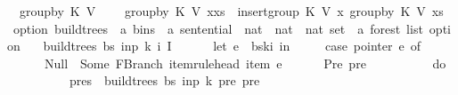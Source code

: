 \begin{isabellebody}
\ \ {\isachardoublequoteopen}group{\isacharunderscore}{\kern0pt}by\ K\ V\ {\isacharbrackleft}{\kern0pt}{\isacharbrackright}{\kern0pt}\ {\isacharequal}{\kern0pt}\ {\isacharbrackleft}{\kern0pt}{\isacharbrackright}{\kern0pt}{\isachardoublequoteclose}\isanewline
{\isacharbar}{\kern0pt}\ {\isachardoublequoteopen}group{\isacharunderscore}{\kern0pt}by\ K\ V\ {\isacharparenleft}{\kern0pt}x{\isacharhash}{\kern0pt}xs{\isacharparenright}{\kern0pt}\ {\isacharequal}{\kern0pt}\ insert{\isacharunderscore}{\kern0pt}group\ K\ V\ x\ {\isacharparenleft}{\kern0pt}group{\isacharunderscore}{\kern0pt}by\ K\ V\ xs{\isacharparenright}{\kern0pt}{\isachardoublequoteclose}\isanewline
%
\isadelimproof
%
\endisadelimproof
%
\isatagproof
%
\endisatagproof
{\isafoldproof}%
%
\isadelimproof
\isanewline
%
\endisadelimproof
{}\isamarkupfalse%
\ {\isacharparenleft}{\kern0pt}option{\isacharparenright}{\kern0pt}\ build{\isacharunderscore}{\kern0pt}trees{\isacharprime}{\kern0pt}\ {\isacharcolon}{\kern0pt}{\isacharcolon}{\kern0pt}\ {\isachardoublequoteopen}{\isacharprime}{\kern0pt}a\ bins\ {\isasymRightarrow}\ {\isacharprime}{\kern0pt}a\ sentential\ {\isasymRightarrow}\ nat\ {\isasymRightarrow}\ nat\ {\isasymRightarrow}\ nat\ set\ {\isasymRightarrow}\ {\isacharprime}{\kern0pt}a\ forest\ list\ option{\isachardoublequoteclose}\ \isanewline
\ \ {\isachardoublequoteopen}build{\isacharunderscore}{\kern0pt}trees{\isacharprime}{\kern0pt}\ bs\ inp\ k\ i\ I\ {\isacharequal}{\kern0pt}\ {\isacharparenleft}{\kern0pt}\isanewline
\ \ \ \ let\ e\ {\isacharequal}{\kern0pt}\ bs{\isacharbang}{\kern0pt}k{\isacharbang}{\kern0pt}i\ in\ {\isacharparenleft}{\kern0pt}\isanewline
\ \ \ \ case\ pointer\ e\ of\isanewline
\ \ \ \ \ \ Null\ {\isasymRightarrow}\ Some\ {\isacharparenleft}{\kern0pt}{\isacharbrackleft}{\kern0pt}FBranch\ {\isacharparenleft}{\kern0pt}item{\isacharunderscore}{\kern0pt}rule{\isacharunderscore}{\kern0pt}head\ {\isacharparenleft}{\kern0pt}item\ e{\isacharparenright}{\kern0pt}{\isacharparenright}{\kern0pt}\ {\isacharbrackleft}{\kern0pt}{\isacharbrackright}{\kern0pt}{\isacharbrackright}{\kern0pt}{\isacharparenright}{\kern0pt}\isanewline
\ \ \ \ {\isacharbar}{\kern0pt}\ Pre\ pre\ {\isasymRightarrow}\ {\isacharparenleft}{\kern0pt}\isanewline
\ \ \ \ \ \ \ \ do\ {\isacharbraceleft}{\kern0pt}\isanewline
\ \ \ \ \ \ \ \ \ \ pres\ {\isasymleftarrow}\ build{\isacharunderscore}{\kern0pt}trees{\isacharprime}{\kern0pt}\ bs\ inp\ {\isacharparenleft}{\kern0pt}k{\isacharminus}{\kern0pt}{}{\isacharparenright}{\kern0pt}\ pre\ {\isacharbraceleft}{\kern0pt}pre{\isacharbraceright}{\kern0pt}{\isacharsemicolon}{\kern0pt}\isanewline

\end{isabellebody}
